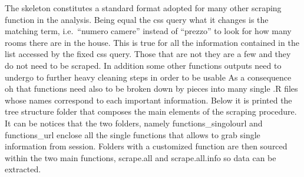 \documentclass[
  12pt,
  a4paper,
  oneside]{book}
\newenvironment{Shaded}{\begin{snugshade}}{\end{snugshade}}
\newcommand{\DataTypeTok}[1]{\textcolor[rgb]{0.13,0.29,0.53}{#1}}
\newcommand{\ErrorTok}[1]{\textcolor[rgb]{0.64,0.00,0.00}{\textbf{#1}}}
\newcommand{\KeywordTok}[1]{\textcolor[rgb]{0.13,0.29,0.53}{\textbf{#1}}}
\newcommand{\NormalTok}[1]{#1}
\newcommand{\StringTok}[1]{\textcolor[rgb]{0.31,0.60,0.02}{#1}}
\theoremstyle{definition}
\theoremstyle{definition}
\theoremstyle{definition}
\theoremstyle{remark}
\begin{document}
\begin{Shaded}
\begin{Highlighting}[]
{\NormalTok{                  ...}
                  
\NormalTok{                   combine =}\StringTok{ }\KeywordTok{tibble}\NormalTok{(}\DataTypeTok{ID        =}\NormalTok{ id,}
                                     \DataTypeTok{LAT       =}\NormalTok{ lat, }
                                     \DataTypeTok{LONG      =}\NormalTok{ long,}
                                     \DataTypeTok{LOCATION  =}\NormalTok{ location,}
                                     \DataTypeTok{CONDOM    =}\NormalTok{ condom,}
                                     \DataTypeTok{BUILDAGE  =}\NormalTok{ buildage,}
                                    
\NormalTok{                  ...}
                  
                  
                  \KeywordTok{return}\NormalTok{(combine) }
                  \ErrorTok{\}}
  \KeywordTok{stopCluster}\NormalTok{(cl)}
  \KeywordTok{return}\NormalTok{(ALL)}
\ErrorTok{\}}
\end{Highlighting}
\end{Shaded}

The skeleton constitutes a standard format adopted for many other scraping function in the analysis. Being equal the css query what it changes is the matching term, i.e.~``numero camere'' instead of ``prezzo'' to look for how many rooms there are in the house. This is true for all the information contained in the list accessed by the fixed css query. Those that are not they are a few and they do not need to be scraped.
In addition some other functions outputs need to undergo to further heavy cleaning steps in order to be usable As a consequence oh that functions need also to be broken down by pieces into many single .R files whose names correspond to each important information.
Below it is printed the tree structure folder that composes the main elements of the scraping procedure. It can be notices that the two folders, namely functions\_singolourl and functions\_url enclose all the single functions that allows to grab single information from session. Folders with a customized function are then sourced within the two main functions, scrape.all and scrape.all.info so data can be extracted.
\end{document}
